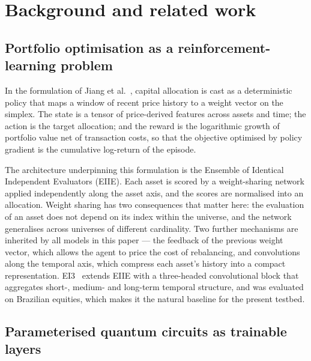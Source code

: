 \documentclass[aps,floatfix,superscriptaddress,twocolumn,tightenlines,amsmath,amssymb,nofootinbib,10pt,longbibliography,prl]{revtex4-2}
\begin{document}

\section{Background and related work}
\label{sec:background}

\subsection{Portfolio optimisation as a reinforcement-learning problem}
\label{subsec:bg-portfolio}

In the formulation of Jiang et al.~\cite{jiang2017deepreinforcementlearningframework}, capital allocation is cast as a deterministic policy that maps a window of recent price history to a weight vector on the simplex. The state is a tensor of price-derived features across assets and time; the action is the target allocation; and the reward is the logarithmic growth of portfolio value net of transaction costs, so that the objective optimised by policy gradient is the cumulative log-return of the episode.

The architecture underpinning this formulation is the Ensemble of Identical Independent Evaluators (EIIE). Each asset is scored by a weight-sharing network applied independently along the asset axis, and the scores are normalised into an allocation. Weight sharing has two consequences that matter here: the evaluation of an asset does not depend on its index within the universe, and the network generalises across universes of different cardinality. Two further mechanisms are inherited by all models in this paper --- the feedback of the previous weight vector, which allows the agent to price the cost of rebalancing, and convolutions along the temporal axis, which compress each asset's history into a compact representation. EI3~\cite{RLportfolio} extends EIIE with a three-headed convolutional block that aggregates short-, medium- and long-term temporal structure, and was evaluated on Brazilian equities, which makes it the natural baseline for the present testbed.

\subsection{Parameterised quantum circuits as trainable layers}
\label{subsec:bg-pqc}
\end{document}
